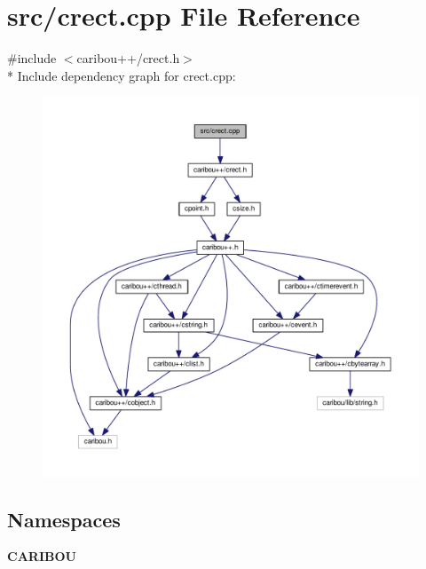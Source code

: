 \section{src/crect.cpp File Reference}
\label{crect_8cpp}
{\ttfamily \#include $<$caribou++/crect.\-h$>$}\\*
Include dependency graph for crect.\-cpp\-:\nopagebreak
\begin{figure}[H]
\begin{center}
\leavevmode
\includegraphics[width=350pt]{crect_8cpp__incl}
\end{center}
\end{figure}
\subsection*{Namespaces}
\begin{DoxyCompactItemize}
\item 
{\bf C\-A\-R\-I\-B\-O\-U}
\end{DoxyCompactItemize}
